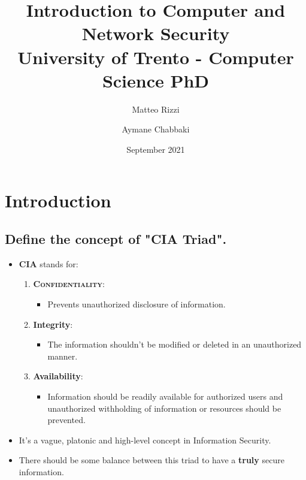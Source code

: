 \documentclass[9pt, letterpaper]{article}
\title{%
  Introduction to Computer and Network Security \\
  \large University of Trento - Computer Science PhD}
\author{Matteo Rizzi \and Aymane Chabbaki}
\date{September 2021}
\begin{document}
\graphicspath{ {img/} }
\begin{titlepage}
	\maketitle
	\tableofcontents
\end{titlepage}

\section{Introduction}

\subsection{Define the concept of "CIA Triad".}
\begin{itemize}
	\item \textbf{CIA} stands for:
	      \begin{enumerate}
		      \item \textbf{\textsc{Confidentiality}}:
		            \begin{itemize}
			            \item Prevents unauthorized disclosure of information.
		            \end{itemize}
		      \item \textbf{Integrity}:
		            \begin{itemize}
			            \item The information shouldn't be modified or deleted in an unauthorized manner.
		            \end{itemize}
		      \item \textbf{Availability}:
		            \begin{itemize}
			            \item Information should be readily available for authorized users and unauthorized withholding of information or resources should be prevented.
		            \end{itemize}
	      \end{enumerate}
	\item It's a vague, platonic and high-level concept in Information Security.
	\item 	There should be some balance between this triad to have a \textbf{truly} secure information.
\end{itemize}
\end{document}
